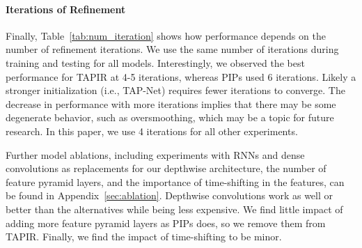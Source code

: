 \documentclass[10pt,twocolumn,letterpaper]{article}
\begin{document}
\begin{table}[t]
\caption{\textbf{Evaluation performance against the number of iterative updates.} It can be observed that after 4 iterations, the performance no longer improves significantly. This could be attributed to the fact that TAP-Net already provides a good initialization.}
\label{tab:num_iteration}
\end{table}

\paragraph{Iterations of Refinement} Finally, Table~\ref{tab:num_iteration} shows how performance depends on the number of refinement iterations. We use the same number of iterations during training and testing for all models. Interestingly, we observed the best performance for TAPIR at 4-5 iterations, whereas PIPs used 6 iterations. Likely a stronger initialization (i.e., TAP-Net) requires fewer iterations to converge. The decrease in performance with more iterations implies that there may be some degenerate behavior, such as oversmoothing, which may be a topic for future research. In this paper, we use 4 iterations for all other experiments.

Further model ablations, including experiments with RNNs and dense convolutions as replacements for our depthwise architecture, the number of feature pyramid layers, and the importance of time-shifting in the features, can be found in Appendix~\ref{sec:ablation}.  Depthwise convolutions work as well or better than the alternatives while being less expensive.  We find little impact of adding more feature pyramid layers as PIPs does, so we remove them from TAPIR.  Finally, we find the impact of time-shifting to be minor.
\end{document}
